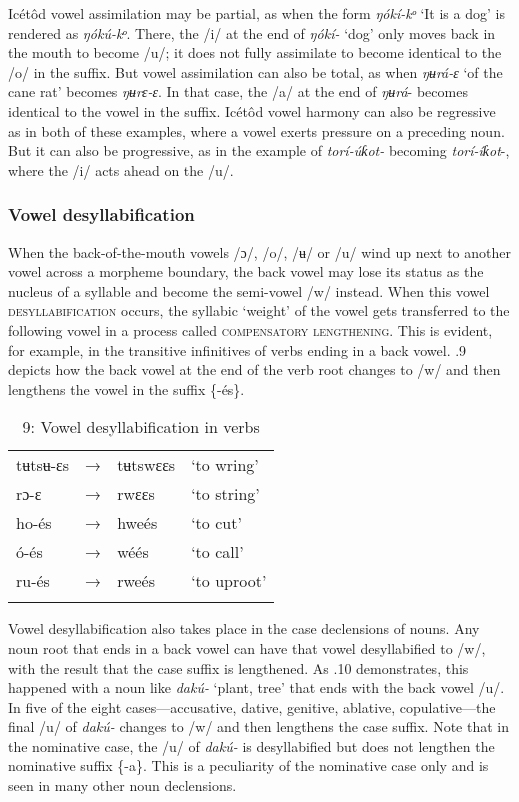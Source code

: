 Icétôd vowel assimilation may be partial, as when the form \textit{ŋókí-kᵒ }‘It is a dog’ is rendered as \textit{ŋókú-kᵒ}. There, the /i/ at the end of \textit{ŋókí-} ‘dog’ only moves back in the mouth to become /u/; it does not fully assimilate to become identical to the /o/ in the suffix. But vowel assimilation can also be total, as when \textit{ŋʉrá-ɛ }‘of the cane rat’ becomes \textit{ŋʉrɛ-ɛ}. In that case, the /a/ at the end of \textit{ŋʉrá}{}- becomes identical to the vowel in the suffix. Icétôd vowel harmony can also be regressive as in both of these examples, where a vowel exerts pressure on a preceding noun. But it can also be progressive, as in the example of \textit{torí-úƙot- }becoming \textit{torí-íƙot}{}-, where the /i/ acts ahead on the /u/.
 
\subsubsection{Vowel desyllabification}

When the back-of-the-mouth vowels /ɔ/, /o/, /ʉ/ or /u/ wind up next to another vowel across a morpheme boundary, the back vowel may lose its status as the nucleus of a syllable and become the semi-vowel /w/ instead. When this vowel \textsc{desyllabification }occurs, the syllabic ‘weight’ of the vowel gets transferred to the following vowel in a process called \textsc{compensatory lengthening}. This is evident, for example, in the transitive infinitives of verbs ending in a back vowel. .9 depicts how the back vowel at the end of the verb root changes to /w/ and then lengthens the vowel in the suffix \{-és\}.


\begin{table}
\caption{9: Vowel desyllabification in verbs}
\label{tab:2}


\begin{tabularx}{\textwidth}{XXXX}
\lsptoprule

tʉtsʉ-ɛs & → & tʉtswɛɛs & ‘to wring’\\
rɔ-ɛ & → & rwɛɛs & ‘to string’\\
ho-és & → & hweés & ‘to cut’\\
ó-és & → & wéés & ‘to call’\\
ru-és & → & rweés & ‘to uproot’\\
\lspbottomrule
\end{tabularx}
\end{table}

Vowel desyllabification also takes place in the case declensions of nouns. Any noun root that ends in a back vowel can have that vowel desyllabified to /w/, with the result that the case suffix is lengthened. As .10 demonstrates, this happened with a noun like \textit{dakú- }‘plant, tree’ that ends with the back vowel /u/. In five of the eight cases—accusative, dative, genitive, ablative, copulative—the final /u/ of \textit{dakú- }changes to /w/ and then lengthens the case suffix. Note that in the nominative case, the /u/ of \textit{dakú-} is desyllabified but does not lengthen the nominative suffix \{-a\}. This is a peculiarity of the nominative case only and is seen in many other noun declensions.


